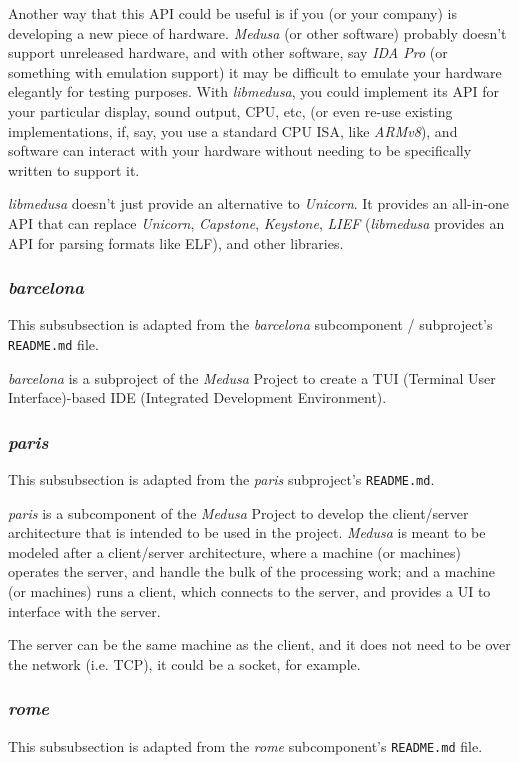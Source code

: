 \documentclass{article}
\begin{document}
	Another way that this API could be useful is if you (or your company) is
	developing a new piece of hardware. \textit{Medusa} (or other software)
	probably doesn't support unreleased hardware, and with other software, say
	\textit{IDA Pro} (or something with emulation support) it may be difficult
	to emulate your hardware elegantly for testing purposes. With
	\textit{libmedusa}, you could implement its API for your particular display,
	sound output, CPU, etc, (or even re-use existing implementations, if, say,
	you use a standard CPU ISA, like \textit{ARMv8}), and software can interact
	with your hardware without needing to be specifically written to support it.

	\textit{libmedusa} doesn't just provide an alternative to \textit{Unicorn}.
	It provides an all-in-one API that can replace \textit{Unicorn},
	\textit{Capstone}, \textit{Keystone}, \textit{LIEF} (\textit{libmedusa}
	provides an API for parsing formats like ELF), and other libraries.

	\subsubsection{\textit{barcelona}}
	This subsubsection is adapted from the \textit{barcelona} subcomponent /
	subproject's \texttt{README.md} file.

	\textit{barcelona} is a subproject of the \textit{Medusa} Project to create
	a TUI (Terminal User Interface)-based IDE (Integrated Development
	Environment).

	\subsubsection{\textit{paris}}
	This subsubsection is adapted from the \textit{paris} subproject's
	\texttt{README.md}.

	\textit{paris} is a subcomponent of the \textit{Medusa} Project to develop
	the client/server architecture that is intended to be used in the project.
	\textit{Medusa} is meant to be modeled after a client/server architecture,
	where a machine (or machines) operates the server, and handle the bulk of
	the processing work; and a machine (or machines) runs a client, which
	connects to the server, and provides a UI to interface with the server.

	The server can be the same machine as the client, and it does not need to be
	over the network (i.e. TCP), it could be a socket, for example.

	\subsubsection{\textit{rome}}
	This subsubsection is adapted from the \textit{rome} subcomponent's
	\texttt{README.md} file.
\end{document}
